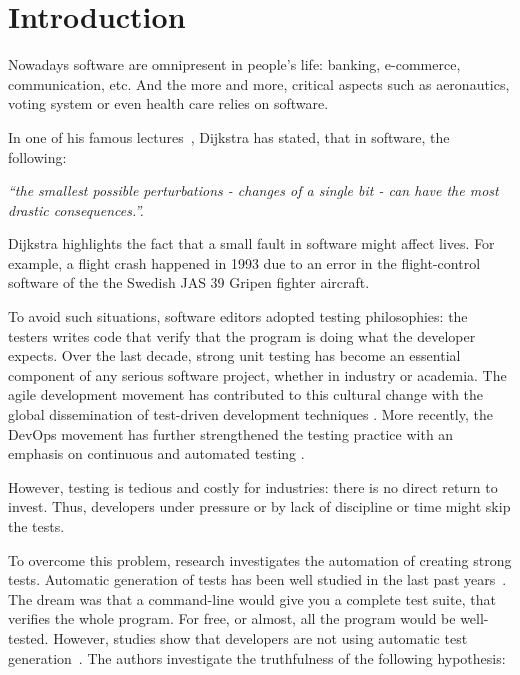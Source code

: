 \chapter{Introduction}
\label{chap:introduction}

\minitoc

\graphicspath{{.}{chapitres/introduction/}}

Nowadays software are omnipresent in people's life: banking, e-commerce, communication, etc. 
And the more and more, critical aspects such as aeronautics, voting system or even health care relies on software.

In one of his famous lectures~\cite{DijkstraLecture1989}, Dijkstra has stated, that in software, the following: 
\begin{center}
	\emph{``the smallest possible perturbations - \ie changes of a single bit - can have the most drastic consequences.''.}
\end{center}

Dijkstra highlights the fact that a small fault in software might affect lives.
For example, a flight crash happened in 1993 due to an error in the flight-control software of the the Swedish JAS 39 Gripen fighter aircraft.

To avoid such situations, software editors adopted testing philosophies: the testers writes code that verify that the program is doing what the developer expects.
Over the last decade, strong unit testing has become an essential component of any serious software project, whether in industry or academia.
The agile development movement has contributed to this cultural change with the global dissemination of test-driven development techniques \cite{beck2003test}.
More recently, the DevOps movement has further strengthened the testing practice with an emphasis on continuous and automated testing \cite{Roche2013Devops}.

However, testing is tedious and costly for industries: there is no direct return to invest.
Thus, developers under pressure or by lack of discipline or time might skip the tests.

To overcome this problem, research investigates the automation of creating strong tests.
Automatic generation of tests has been well studied in the last past years~\cite{ESECFSE11, PachecoE2005}.
The dream was that a command-line would give you a complete test suite, that verifies the whole program.
For free, or almost, all the program would be well-tested.
However, studies show that developers are not using automatic test generation~\cite{TOSEM_userstudy}.
The authors investigate the truthfulness of the following hypothesis:

